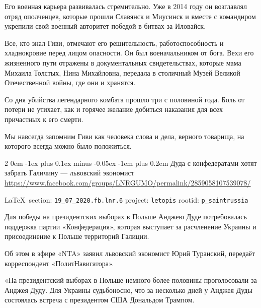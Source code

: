 \documentclass[a4paper,11pt]{extreport}
\makeatletter
\renewcommand\subsection{%
  \clearpage
    \@startsection{subsection}%
    {2}%
    {0em}%
    {-1ex plus 0.1ex minus -0.05ex}%
    {-1em plus 0.2em}%
    {\scshape\bfseries\Large}%
}
\makeatother
\begin{document}

Его военная карьера развивалась стремительно. Уже в 2014 году он возглавлял
отряд ополченцев, которые прошли Славянск и Миусинск и вместе с командиром
укрепили свой военный авторитет победой в битвах за Иловайск.

Все, кто знал Гиви, отмечают его решительность, работоспособность и
хладнокровие перед лицом опасности. Он был военачальником от бога. Вехи его
жизненного пути отражены в документальных свидетельствах, которые мама Михаила
Толстых, Нина Михайловна, передала в столичный Музей Великой Отечественной
войны, где они и хранятся.

Со дня убийства легендарного комбата прошло три с половиной года. Боль от
потери не утихает, как и горячее желание добиться наказания для всех причастных
к его смерти.

Мы навсегда запомним Гиви как человека слова и дела, верного товарища, на
которого всегда можно было положиться. 
 
 
\subsection{Дуда с конфедератами хотят забрать Галичину --- львовский экономист}
\label{sec:19_07_2020.fb.lnr.6}
\url{https://www.facebook.com/groups/LNRGUMO/permalink/2859058107539078/}
  
\vspace{0.5cm}
{\small\LaTeX~section: \verb|19_07_2020.fb.lnr.6| project: \verb|letopis| rootid: \verb|p_saintrussia|}
\vspace{0.5cm}
 
Для победы на президентских выборах в Польше Анджею Дуде потребовалась
поддержка партии «Конфедерация», которая выступает за расчленение Украины и
присоединение к Польше территорий Галиции.

Об этом в эфире «NTA» заявил львовский экономист Юрий Туранский, передаёт
корреспондент «ПолитНавигатора».

«На президентский выборах в Польше немного более половины проголосовали за
Анджея Дуду. Для Украины судьбоносно, что за несколько дней у Анджея Дуды
состоялась встреча с президентом США Дональдом Трампом.
\end{document}
